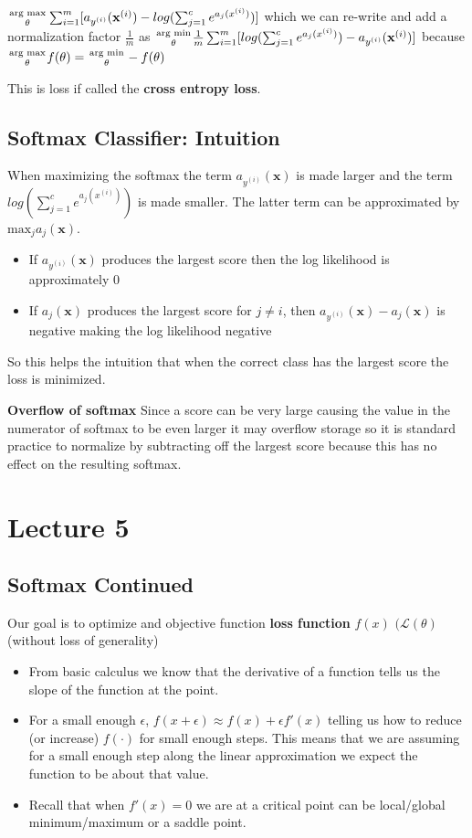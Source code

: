 \documentclass[twocolumn, letter, 10pt, landscape]{article}
\newcommand{\mb}{\mathbf}
\newcommand{\tb}{\textbf}
\newcommand{\bit}{\vspace{-0.1in}\begin{itemize}\setlength\itemsep{-0.05in}}
\newcommand{\eit}{\end{itemize}\vspace{-0.1in}}
\begin{document}
${\text{arg max}\atop \theta}\sum_{i=1}^m [a_{y^{(i)}}(\mb{x}^{(i)}) - log(\sum_{j=1}^ce^{a_j(x^{(i)})})]$ which we can re-write and add a normalization factor $\frac{1}{m}$ as ${\text{arg min}\atop \theta} \frac{1}{m} \sum_{i=1}^m [ log(\sum_{j=1}^ce^{a_j(x^{(i)})}) - a_{y^{(i)}}(\mb{x}^{(i)})]$ because ${\text{arg max}\atop\theta}f(\theta) = {\text{arg min}\atop\theta}-f(\theta)$

This is loss if called the \tb{cross entropy loss}.

\subsection{Softmax Classifier: Intuition}
When maximizing the softmax the term $a_{y^{(i)}}(\mb{x})$ is made larger and the term $log(\sum_{j=1}^ce^{a_j(x^{(i)})})$ is made smaller. The latter term can be approximated by $\text{max}_j a_j(\mb{x})$.
\bit{}
\item If $a_{y^{(i)}}(\mb{x})$ produces the largest score then the log likelihood is approximately $0$
\item If $a_{j}(\mb{x})$ produces the largest score for $j\ne i$, then $a_{y^{(i)}}(\mb{x})-a_j(\mb{x})$ is negative making the log likelihood negative
\eit{}

So this helps the intuition that when the correct class has the largest score the loss is minimized.

\textbf{Overflow of softmax}
Since a score can be very large causing the value in the numerator of softmax to be even larger it may overflow storage so it is standard practice to normalize by subtracting off the largest score because this has no effect on the resulting softmax.

\section{Lecture 5}

\subsection{Softmax Continued}
Our goal is to optimize and objective function \tb{loss function} $f(x)$ $(\mathcal{L}(\theta)$ (without loss of generality)
\bit{}
\item From basic calculus we know that the derivative of a function tells us the slope of the function at the point.
\item For a small enough $\epsilon$, $f(x+\epsilon)\approx f(x)+\epsilon f'(x)$ telling us how to reduce (or increase) $f(\cdot)$ for small enough steps. This means that we are assuming for a small enough step along the linear approximation we expect the function to be about that value.
\item Recall that when $f'(x)=0$ we are at a critical point can be local/global minimum/maximum or a saddle point.
\eit{}
\end{document}
